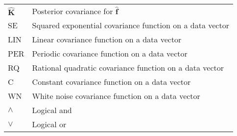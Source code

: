 \begin{tabular}{l l}
 $\mathbf{\hat{K}}$     & Posterior covariance for $\mathbf{\hat{f}}$ \\
 SE	        & Squared exponential covariance function on a data vector \\
 LIN		        & Linear covariance function on a data vector \\
 PER		        & Periodic covariance function on a data vector \\
 RQ		        & Rational quadratic covariance function on a data vector \\
 C		        & Constant covariance function on a data vector \\
 WN		        & White noise covariance function on a data vector \\
 $\land$                & Logical and \\
 $\lor$                 & Logical or \\
\end{tabular}
